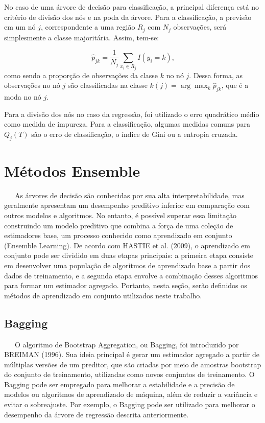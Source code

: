 \documentclass[
  12pt,
  a4paper,
]{scrreprt}
\begin{document}
\vspace{12pt}

No caso de uma árvore de decisão para classificação, a principal
diferença está no critério de divisão dos nós e na poda da árvore. Para
a classificação, a previsão em um nó \(j\), correspondente a uma região
\(R_j\) com \(N_j\) observações, será simplesmente a classe majoritária.
Assim, tem-se:

\[
\hat{p}_{jk} = \frac{1}{N_j}\sum_{x_i \in R_j} I\left(y_i = k\right)\text{,}
\] como sendo a proporção de observações da classe \(k\) no nó \(j\).
Dessa forma, as observações no nó \(j\) são classificadas na classe
\(k\left(j\right) = \arg \max_{k} \hat{p}_{jk}\), que é a moda no nó
\(j\).

\vspace{12pt}

Para a divisão dos nós no caso da regressão, foi utilizado o erro
quadrático médio como medida de impureza. Para a classificação, algumas
medidas comuns para \(Q_j\left(T\right)\) são o erro de classificação, o
índice de Gini ou a entropia cruzada.

\section{Métodos Ensemble}\label{muxe9todos-ensemble}

~~~As árvores de decisão são conhecidas por sua alta interpretabilidade,
mas geralmente apresentam um desempenho preditivo inferior em comparação
com outros modelos e algoritmos. No entanto, é possível superar essa
limitação construindo um modelo preditivo que combina a força de uma
coleção de estimadores base, um processo conhecido como aprendizado em
conjunto (Ensemble Learning). De acordo com HASTIE et al. (2009), o
aprendizado em conjunto pode ser dividido em duas etapas principais: a
primeira etapa consiste em desenvolver uma população de algoritmos de
aprendizado base a partir dos dados de treinamento, e a segunda etapa
envolve a combinação desses algoritmos para formar um estimador
agregado. Portanto, nesta seção, serão definidos os métodos de
aprendizado em conjunto utilizados neste trabalho.

\subsection{Bagging}\label{bagging}

~~~O algoritmo de Bootstrap Aggregation, ou Bagging, foi introduzido por
BREIMAN (1996). Sua ideia principal é gerar um estimador agregado a
partir de múltiplas versões de um preditor, que são criadas por meio de
amostras bootstrap do conjunto de treinamento, utilizadas como novos
conjuntos de treinamento. O Bagging pode ser empregado para melhorar a
estabilidade e a precisão de modelos ou algoritmos de aprendizado de
máquina, além de reduzir a variância e evitar o sobreajuste. Por
exemplo, o Bagging pode ser utilizado para melhorar o desempenho da
árvore de regressão descrita anteriormente.
\end{document}
